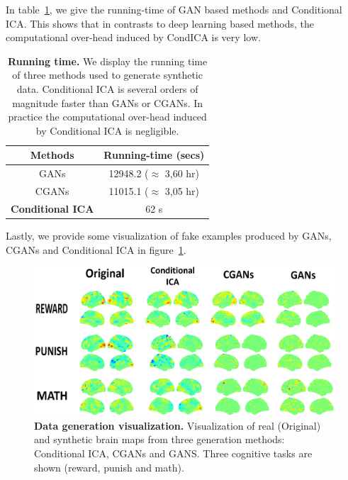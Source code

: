 In table~\ref{app:runningtime:tab}, we give the running-time of GAN based
methods and Conditional ICA. This shows that in contrasts to deep learning based
methods, the computational over-head induced by CondICA is very low.
\begin{table}
  \begin{center}
    \begin{tabular}{|c|c|}
      \hline
      Methods & Running-time (secs)
      \\ \hline
      GANs  & 12948.2 ($\approx$ 3,60 hr)
      \\
      CGANs  & 11015.1 ($\approx$ 3,05 hr)
      \\
      \textbf{Conditional ICA}  & 62 s 
      \\
      \hline
    \end{tabular}
  \end{center}
  \caption{\textbf{Running time.} We display the running time of three methods used
    to generate synthetic data. Conditional ICA is several orders of magnitude faster than
    GANs or CGANs. In practice the computational over-head induced by Conditional ICA is negligible.}\label{app:runningtime:tab}
\end{table}

Lastly, we provide some visualization of fake examples produced by GANs, CGANs and Conditional ICA in figure~\ref{sec:visualization:fig}.
\begin{figure}
  \centerline{\includegraphics[width=0.8\linewidth]{figures/condica/fake_real_viz_v3_redim_improved.png}}
  \caption{\textbf{Data generation visualization.} Visualization of real
    (Original) and synthetic brain maps from three generation methods:
    Conditional ICA, CGANs and GANS. Three cognitive tasks are shown (reward, punish and math).
  }
  \label{sec:visualization:fig}
\end{figure}






